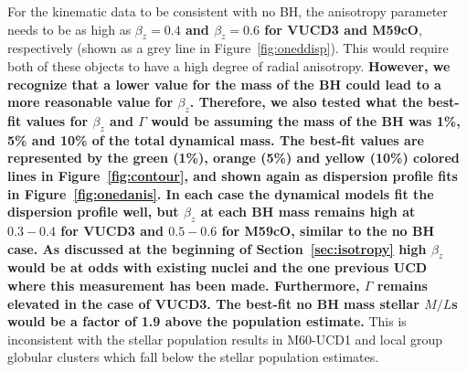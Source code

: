 \documentclass{aastex}
\begin{document}
For the kinematic data to be consistent with no BH, the anisotropy parameter needs to be as high as \textbf{$\beta_z = 0.4$ and $\beta_z = 0.6$ for VUCD3 and M59cO}, respectively (shown as a grey line in Figure~\ref{fig:oneddisp}). This would require both of these objects to have a high degree of radial anisotropy. \textbf{However, we recognize that a lower value for the mass of the BH could lead to a more reasonable value for $\beta_z$. Therefore, we also tested what the best-fit values for $\beta_z$ and $\Gamma$ would be assuming the mass of the BH was 1\%, 5\% and 10\% of the total dynamical mass. The best-fit values are represented by the green (1\%), orange (5\%) and yellow (10\%) colored lines in Figure~\ref{fig:contour}, and shown again as dispersion profile fits in Figure~\ref{fig:onedanis}. In each case the dynamical models fit the dispersion profile well, but $\beta_z$ at each BH mass remains high at $0.3-0.4$ for VUCD3 and $0.5-0.6$ for M59cO, similar to the no BH case.  As discussed at the beginning of Section~\ref{sec:isotropy} high $\beta_z$ would be at odds with existing nuclei and the one previous UCD where this measurement has been made. Furthermore, $\Gamma$ remains elevated in the case of VUCD3. The best-fit no BH mass stellar $M/L$s would be a factor of 1.9 above the population estimate.} This is inconsistent with the stellar population results in M60-UCD1 and local group globular clusters which fall below the stellar population estimates.
\end{document}
